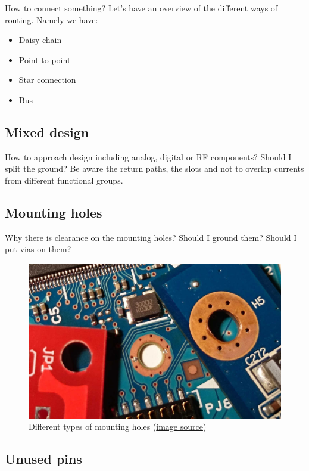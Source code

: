 \documentclass[final]{cubedoc}
\begin{document}
	How to connect something? Let's have an overview of the different ways of routing.
	Namely we have:
	
	\begin{itemize}
		\item Daisy chain
		\item Point to point
		\item Star connection
		\item Bus
	\end{itemize}
	
	\subsection{Mixed design}
	
	
	How to approach design including analog, digital or RF components? Should I split the ground? Be aware the return paths, the slots and not to overlap currents from different functional groups.
	
	
	\subsection{Mounting holes}
	
	
	Why there is clearance on the mounting holes? Should I ground them? Should I put vias on them?
	
	\begin{figure}[h!]
		\centering
		\includegraphics[keepaspectratio, height=.25\textheight, width = .8\textwidth]{assets/mounting_holes.jpg}
		\caption{Different types of mounting holes \small{(\href{https://web.archive.org/web/20200814194327/https://electronics.stackexchange.com/questions/137394/mounting-hole-on-a-pcb?rq=1}{image source}})}
	\end{figure}
	
	
	\subsection{Unused pins}
	
\end{document}
